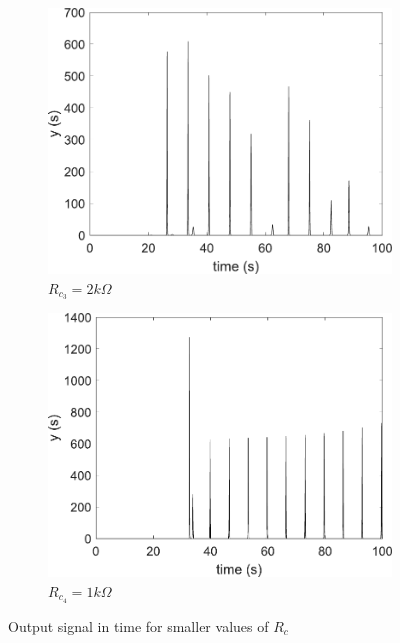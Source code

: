 \begin{figure}
\begin{subfigure}[b]{0.22\textwidth}
            \centering 
            \includegraphics[scale=0.28]{figs/paraCdown/outParaC2.pdf}
            \caption{$R_{c_3} = 2k\Omega$}    
        \end{subfigure}
        \begin{subfigure}[b]{0.22\textwidth}   
            \centering 
            \includegraphics[scale=0.28]{figs/paraCdown/outParaC1.pdf}
            \caption{$R_{c_4} = 1k\Omega$}   
        \end{subfigure}
        \caption{Output signal in time for smaller values of $R_c$} 
        \label{fig:paraCvarDown}
	\end{figure}
	
